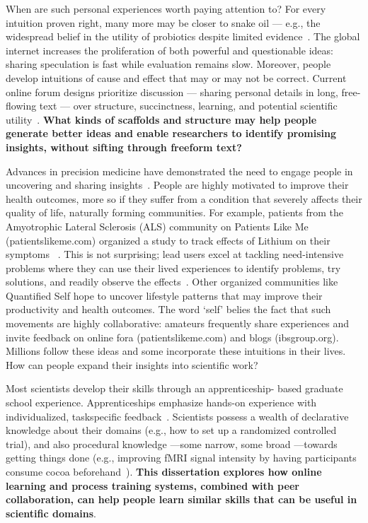 When are such personal experiences worth paying attention
to? For every intuition proven right, many more may be
closer to snake oil — e.g., the widespread belief in the utility
of probiotics despite limited evidence~\cite{Bonifait2009}. The global internet
increases the proliferation of both powerful and questionable
ideas: sharing speculation is fast while evaluation remains
slow. Moreover, people develop intuitions of cause and effect
that may or may not be correct. Current online forum
designs prioritize discussion — sharing personal details in
long, free-flowing text — over structure, succinctness, learning,
and potential scientific utility~\cite{Thomas2002}. \textbf{What kinds of scaffolds
and structure may help people generate better ideas and
enable researchers to identify promising insights, without
sifting through freeform text?}

Advances in precision medicine have demonstrated the need
to engage people in uncovering and sharing insights~\cite{Aronson2015}. People
are highly motivated to improve their health outcomes,
more so if they suffer from a condition that severely affects
their quality of life, naturally forming communities. For example,
patients from the Amyotrophic Lateral Sclerosis
(ALS) community on Patients Like Me (patientslikeme.com)
organized a study to track effects of Lithium on their symptoms
~\cite{Wicks2011}. This is not surprising; lead users excel at tackling
need-intensive problems where they can use their lived
experiences to identify problems, try solutions, and readily
observe the effects~\cite{VonHippel2005}. Other organized communities like
Quantified Self hope to uncover lifestyle patterns that may
improve their productivity and health outcomes. The word
‘self’ belies the fact that such movements are highly collaborative:
amateurs frequently share experiences and invite
feedback on online fora (patientslikeme.com) and blogs
(ibsgroup.org). Millions follow these ideas and some incorporate
these intuitions in their lives. How can people expand
their insights into scientific work?

Most scientists develop their skills through an apprenticeship-
based graduate school experience. Apprenticeships emphasize
hands-on experience with individualized, taskspecific
feedback~\cite{schon1984reflective}. Scientists possess a wealth of declarative
knowledge about their domains (e.g., how to set up a
randomized controlled trial), and also procedural knowledge
—some narrow, some broad —towards getting things done
(e.g., improving fMRI signal intensity by having participants
consume cocoa beforehand~\cite{Francis2006}). \textbf{This dissertation explores how
online learning and process training systems, combined with
peer collaboration, can help people learn similar skills that
can be useful in scientific domains}.

